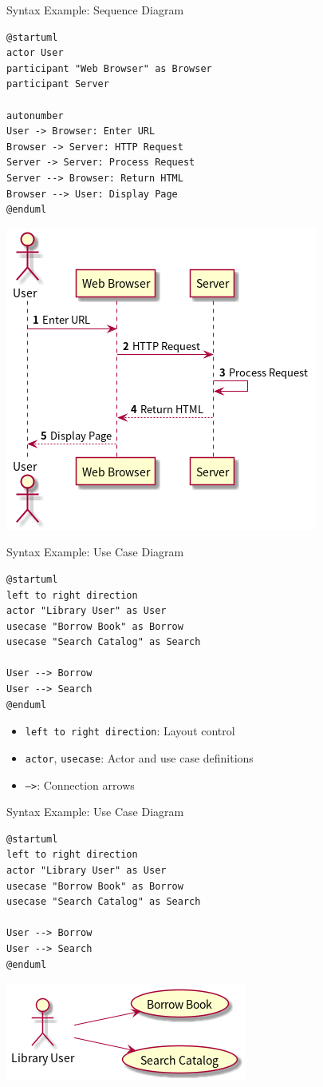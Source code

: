 \documentclass{beamer}
\begin{document}
\begin{frame}[fragile,t]{Syntax Example: Sequence Diagram}
    \begin{lstlisting}[style=plantuml]
@startuml
actor User
participant "Web Browser" as Browser
participant Server

autonumber
User -> Browser: Enter URL
Browser -> Server: HTTP Request
Server -> Server: Process Request
Server --> Browser: Return HTML
Browser --> User: Display Page
@enduml
    \end{lstlisting}
    
    \includegraphics[width=.3\textwidth]{images/sequence.png} 
\end{frame}

\begin{frame}[fragile,t]{Syntax Example: Use Case Diagram}
    \begin{lstlisting}[style=plantuml]
@startuml
left to right direction
actor "Library User" as User
usecase "Borrow Book" as Borrow
usecase "Search Catalog" as Search

User --> Borrow
User --> Search
@enduml
    \end{lstlisting}
    
    \small
    \begin{itemize}
        \item \texttt{left to right direction}: Layout control
        \item \texttt{actor}, \texttt{usecase}: Actor and use case definitions
        \item \texttt{-->}: Connection arrows
    \end{itemize}
\end{frame}

\begin{frame}[fragile,t]{Syntax Example: Use Case Diagram}
    \begin{lstlisting}[style=plantuml]
@startuml
left to right direction
actor "Library User" as User
usecase "Borrow Book" as Borrow
usecase "Search Catalog" as Search

User --> Borrow
User --> Search
@enduml
    \end{lstlisting}
    
    \includegraphics[width=.3\textwidth]{images/usecase.png} 
\end{frame}
\end{document}
